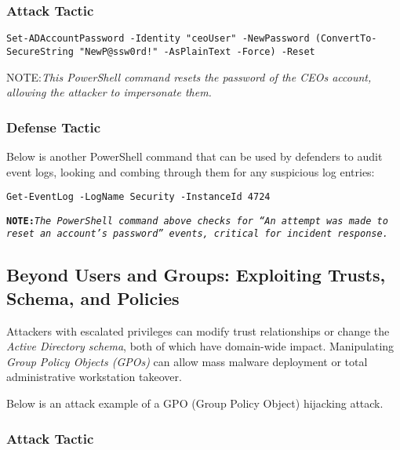 \subsubsection{Attack Tactic}
\texttt{Set-ADAccountPassword -Identity "ceoUser" -NewPassword (ConvertTo-SecureString "NewP@ssw0rd!" -AsPlainText -Force) -Reset}

NOTE:\textit{This PowerShell command resets the password of the CEOs account, allowing the attacker to impersonate them.}

\subsubsection{Defense Tactic}
Below is another PowerShell command that can be used by defenders to audit event logs, looking and combing through them for any suspicious log entries:

\texttt{Get-EventLog -LogName Security -InstanceId 4724}

\texttt{\textbf{NOTE:}\textit{The PowerShell command above checks for “An attempt was made to reset an account’s password” events, critical for incident response.}}

\subsection{Beyond Users and Groups: Exploiting Trusts, Schema, and Policies}

Attackers with escalated privileges can modify trust relationships or change the \textit{Active Directory schema}, both of which have domain-wide impact. Manipulating \textit{Group Policy Objects (GPOs)} can allow mass malware deployment or total administrative workstation takeover.

Below is an attack example of a GPO (Group Policy Object) hijacking attack.

\subsubsection{Attack Tactic}


\begin{table}
\centering

\begin{tabular}{l}
\\

\end{tabular}

\end{table}

